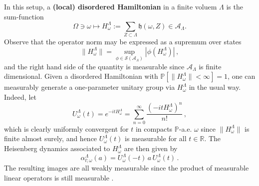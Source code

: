 \documentclass{article}
\newcommand{\A}{\mathcal{A}}
\newcommand{\R}{\mathbb R}
\renewcommand{\P}{\mathbb{P}}
\newcommand{\<}{\langle}
\renewcommand{\>}{\rangle}
\newcommand{\h}{\mathfrak{h}}
\theoremstyle{definition}
\numberwithin{equation}{section}
\begin{document}
In this setup, a \textbf{(local) disordered Hamiltonian} in a finite voluem $\Lambda$ is the sum-function  
\[
    \Omega \ni \omega\longmapsto H^{\Lambda}_\omega := \sum_{Z\subset \Lambda} \h(\omega,Z)\in\A_{\Lambda}.
\] Observe that the operator norm may be expressed as a supremum over states
    \[
        \|H^{\Lambda}_\omega \| = \sup_{\phi \in \mathcal{S}(\A_{\Lambda})} |\phi(H^{\Lambda}_{\omega})|\,,
    \] and the right hand side of the quantity is measurable since $\A_{\Lambda}$ is finite dimensional. Given a disordered Hamiltonian with $\P[ \|H^{\Lambda}_\omega \| < \infty]=1$, one can measurably generate a one-parameter unitary group via $H^{\Lambda}_\omega$ in the usual way. Indeed, let 
\[
    U^{\Lambda}_\omega(t) = e^{-itH^{\Lambda}_\omega} = \sum_{n=0}^\infty \frac{(-itH^{\Lambda}_\omega)^n}{n!}\,,
\] which is clearly uniformly convergent for $t$ in compacts $\P$-a.e. $\omega$ since $\|H^\Lambda_\omega\|$ is finite almost surely, and hence $U^{\Lambda}_\omega(t)$ is measurable for all $t\in \R$. The Heisenberg dynamics associated to $H^{\Lambda}_\omega$ are then given by 
\begin{equation}\label{eqn:local_dynamics}
    \alpha^{\Lambda}_{t;\omega}(a) = U^{\Lambda}_\omega(-t)\,a\, U^{\Lambda}_{\omega}(t)\,.
\end{equation} The resulting images are all weakly measurable since the product of measurable linear operators is still measurable \cite[Theorem 2.14]{Bharucha-Reid}.
\end{document}

